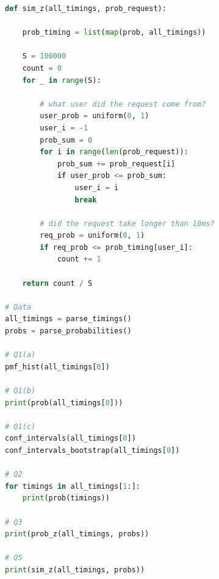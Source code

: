 \documentclass[12pt]{article}
\begin{document}
\begin{lstlisting}[language=Python]
def sim_z(all_timings, prob_request):

	prob_timing = list(map(prob, all_timings))

	S = 100000
	count = 0
	for _ in range(S):

		# what user did the request come from?
		user_prob = uniform(0, 1)
		user_i = -1
		prob_sum = 0
		for i in range(len(prob_request)):
			prob_sum += prob_request[i]
			if user_prob <= prob_sum:
				user_i = i
				break

		# did the request take longer than 10ms?
		req_prob = uniform(0, 1)
		if req_prob <= prob_timing[user_i]:
			count += 1

	return count / S

# Data
all_timings = parse_timings()
probs = parse_probabilities()

# Q1(a)
pmf_hist(all_timings[0])

# Q1(b)
print(prob(all_timings[0]))

# Q1(c)
conf_intervals(all_timings[0])
conf_intervals_bootstrap(all_timings[0])

# Q2
for timings in all_timings[1:]:
	print(prob(timings))

# Q3
print(prob_z(all_timings, probs))

# Q5
print(sim_z(all_timings, probs))
\end{lstlisting}
\end{document}
